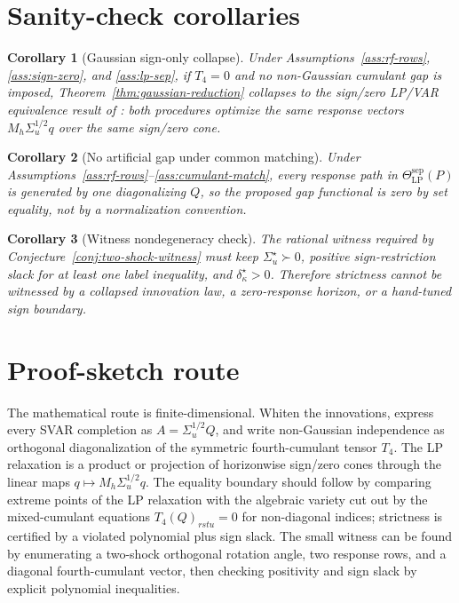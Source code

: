 \documentclass[11pt]{article}
\theoremstyle{definition}
\theoremstyle{plain}
\newtheorem{corollary}{Corollary}
\theoremstyle{remark}
\begin{document}
\section{Sanity-check corollaries}
\begin{corollary}[Gaussian sign-only collapse]\label{cor:gaussian}
Under Assumptions~\ref{ass:rf-rows}, \ref{ass:sign-zero}, and \ref{ass:lp-sep}, if \(T_4=0\) and no non-Gaussian cumulant gap is imposed, Theorem~\ref{thm:gaussian-reduction} collapses to the sign/zero LP/VAR equivalence result of \citet{PlagborgMollerWolf2021}: both procedures optimize the same response vectors \(M_h\Sigma_u^{1/2}q\) over the same sign/zero cone.
\end{corollary}

\begin{corollary}[No artificial gap under common matching]\label{cor:matched}
Under Assumptions~\ref{ass:rf-rows}--\ref{ass:cumulant-match}, every response path in \(\Theta_{\mathrm{LP}}^{\mathrm{sep}}(P)\) is generated by one diagonalizing \(Q\), so the proposed gap functional is zero by set equality, not by a normalization convention.
\end{corollary}

\begin{corollary}[Witness nondegeneracy check]\label{cor:witness-nondegenerate}
The rational witness required by Conjecture~\ref{conj:two-shock-witness} must keep \(\Sigma_u^\star\succ0\), positive sign-restriction slack for at least one label inequality, and \(\delta_\kappa^\star>0\).  Therefore strictness cannot be witnessed by a collapsed innovation law, a zero-response horizon, or a hand-tuned sign boundary.
\end{corollary}

\section{Proof-sketch route}
The mathematical route is finite-dimensional.  Whiten the innovations, express every SVAR completion as \(A=\Sigma_u^{1/2}Q\), and write non-Gaussian independence as orthogonal diagonalization of the symmetric fourth-cumulant tensor \(T_4\).  The LP relaxation is a product or projection of horizonwise sign/zero cones through the linear maps \(q\mapsto M_h\Sigma_u^{1/2}q\).  The equality boundary should follow by comparing extreme points of the LP relaxation with the algebraic variety cut out by the mixed-cumulant equations \(T_4(Q)_{rstu}=0\) for non-diagonal indices; strictness is certified by a violated polynomial plus sign slack.  The small witness can be found by enumerating a two-shock orthogonal rotation angle, two response rows, and a diagonal fourth-cumulant vector, then checking positivity and sign slack by explicit polynomial inequalities.
\end{document}
